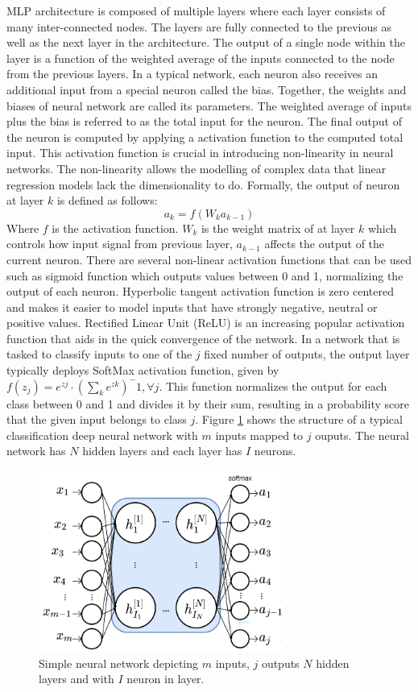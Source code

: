 \documentclass[conference]{IEEEtran}
\begin{document}
MLP architecture is composed of multiple layers where each layer consists of many inter-connected nodes. The layers are fully connected to the previous as well as the next layer in the architecture. The output of a single node within the layer is a function of the weighted average of the inputs connected to the node from the previous layers. In a typical network, each neuron also receives an additional input from a special neuron called the bias.  Together, the weights and biases of neural network are called its parameters. The weighted average of inputs plus the bias is referred to as the total input for the neuron. The final output of the neuron is computed by applying a activation function to the computed total input. This activation function is crucial in introducing non-linearity in neural networks. The non-linearity allows the modelling of complex data that linear regression models lack the dimensionality to do.
Formally, the output of neuron at layer $k$ is defined as follows:
$$a_k=f(W_k a_{k-1})$$
Where $f$ is the activation function.  $W_k$ is the weight matrix of at layer $k$ which controls how input signal from previous layer, $a_{k-1}$ affects the output of the current neuron. 
There are several non-linear activation functions that can be used such as sigmoid function which outputs values between 0 and 1, normalizing the output of each neuron. Hyperbolic tangent activation function is zero centered and makes it easier to model inputs that have strongly negative, neutral or positive values. Rectified Linear Unit (ReLU) is an increasing popular activation function that aids in the quick convergence of the network. In a network that is tasked to classify inputs to one of the $j$ fixed number of outputs, the output layer typically deploys SoftMax activation function, given by 
$f(z_j) = e^{zj}\cdot (\sum_ke^{zk})^-1, \forall j$.
This function normalizes the output for each class between 0 and 1 and divides it by their sum, resulting in a probability score that the given input belongs to class $j$. 
Figure \ref{fig:SimplNN} shows the structure of a typical classification deep neural network with $m$ inputs mapped to $j$ ouputs. The neural network has $N$ hidden layers and each layer has $I$ neurons.
\begin{figure}[!h]
\includegraphics[width=8cm, keepaspectratio]{SimpleNN}
\caption{Simple neural network depicting $m$ inputs, $j$ outputs  $N$  hidden layers and with $I$ neuron in layer.}
\label{fig:SimplNN}

\end{figure}
\end{document}

